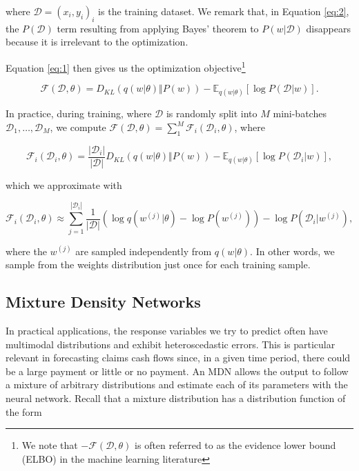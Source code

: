 \documentclass{article}
\begin{document}
where $\mathcal{D} = (x_i, y_i)_i$ is the training dataset. We remark that, in Equation \ref{eq:2}, the $P(\mathcal{D})$ term resulting from applying Bayes' theorem to $P(w|\mathcal{D})$ disappears because it is irrelevant to the optimization.

Equation \ref{eq:1} then gives us the optimization objective\footnote{We note that $-\mathcal{F}(\mathcal{D}, \theta)$ is often referred to as the evidence lower bound (ELBO) in the machine learning literature}

\begin{equation}
    \mathcal{F}(\mathcal{D}, \theta) = D_{KL}(q(w|\theta) \Vert P(w)) - \mathbb{E}_{q(w|\theta)}[\log P(\mathcal{D}|w)].
\end{equation}

In practice, during
training, where $\mathcal{D}$ is randomly split into $M$ mini-batches
$\mathcal{D}_1,\dots,\mathcal{D}_M$, we compute 
$\mathcal{F}(\mathcal{D}, \theta) = \sum_1^M \mathcal{F}_i(\mathcal{D}_i, \theta)$, 
where

\begin{equation}
    \mathcal{F}_i(\mathcal{D}_i, \theta) = \frac{|\mathcal{D}_i|}{|\mathcal{D}|}D_{KL}(q(w|\theta) \Vert P(w)) - \mathbb{E}_{q(w|\theta)}[\log P(\mathcal{D}_i|w)],
\end{equation}

which we approximate with

\begin{equation}
    \mathcal{F}_i(\mathcal{D}_i, \theta) \approx \sum_{j=1}^{|\mathcal{D}_i|} \frac{1}{|\mathcal{D}|} ( \log q(w^{(j)}|\theta) - \log P(w^{(j)}) ) - \log P(\mathcal{D}_i|w^{(j)}),
\end{equation}

where the $w^{(j)}$ are sampled independently from $q(w|\theta)$. In other
words, we sample from the weights distribution just once for each training 
sample.

\subsection{Mixture Density Networks}\label{section:mdn}

In practical applications, the response variables we try to predict often have
multimodal distributions and exhibit heteroscedastic errors. This is particular 
relevant in forecasting claims cash flows since, in a given time period, there 
could be a large payment or little or no payment. An MDN allows the output to
follow a mixture of arbitrary distributions and estimate each of its parameters 
with the neural network. Recall that a mixture distribution has a distribution 
function of the form
\end{document}
